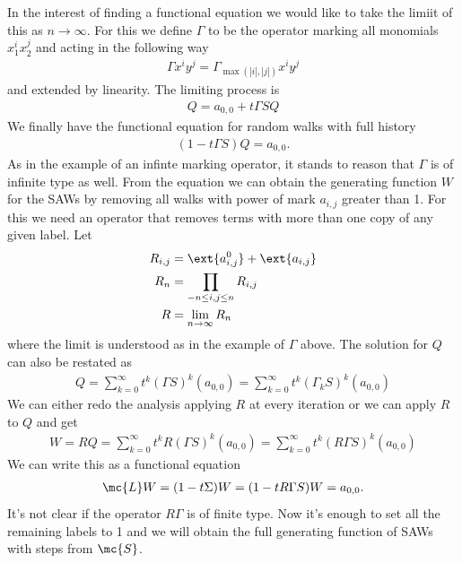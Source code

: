In the interest of finding a functional equation we would like to take the limiit of this as $n \to \infty$. For this we define $\Gamma$ to be the operator marking all monomials $x_1^ix_2^j$ and acting in the following way
\begin{align}
	\Gamma x^i y^j = \Gamma_{\max(|i|,|j|)} x^i y^j
\end{align}
and extended by linearity. The limiting process is
\begin{align}
	Q = a_{0,0} + t \Gamma SQ
\end{align}
We finally have the functional equation for random walks with full history
\begin{align}
	(1 -t\Gamma S)Q = a_{0,0}.
\end{align}
As in the example of an infinte marking operator, it stands to reason that $\Gamma$ is of infinite type as well. From the equation we can obtain the generating function $W$ for the SAWs by removing all walks with power of mark $a_{i,j}$ greater than 1. For this we need an operator that removes terms with more than one copy of any given label. Let
\begin{align}
	R_{i,j} &= \ext{a_{i,j}^0} + \ext{a_{i,j}}\\
	R_n &= \prod_{-n\leq i,j \leq n} R_{i,j}\\
	R &= \lim_{n\to \infty} R_n
\end{align}
where the limit is understood as in the example of $\Gamma$ above. The solution for $Q$ can also be restated as
\begin{align}
	Q = \sum_{k=0}^{\infty} t^k (\Gamma S)^{k}(a_{0,0}) = \sum_{k=0}^{\infty} t^k (\Gamma_k S)^{k}(a_{0,0}) 
\end{align}
We can either redo the analysis applying $R$ at every iteration or we can apply $R$ to $Q$ and get
\begin{align}
	W = RQ = \sum_{k=0}^{\infty} t^k R(\Gamma S)^{k}(a_{0,0}) = \sum_{k=0}^{\infty} t^k (R\Gamma S)^{k}(a_{0,0}) 
\end{align}
We can write this as a functional equation
\begin{align}
	\mc{L} W = (1-t\Sigma)W = (1-tR\Gamma S)W = a_{0,0}.
\end{align}
It's not clear if the operator $R\Gamma$ is of finite type. Now it's enough to set all the remaining labels to 1 and we will obtain the full generating function of SAWs with steps from $\mc{S}$.

